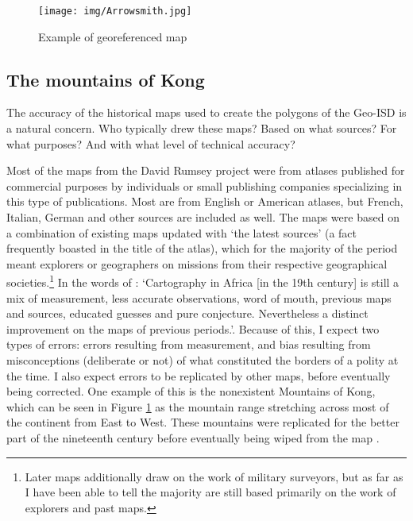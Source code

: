 \documentclass[12pt]{article}
\begin{document}

\begin{figure}[h!tpb]
	\centering
	\texttt{[image: img/Arrowsmith.jpg]}
	\caption{Example of georeferenced map}%
	\label{Arrowsmith}
\end{figure}


\subsection{The mountains of Kong} \label{The mountains of Kong}

The accuracy of the historical maps used to create the polygons of the Geo-ISD
is a natural concern. Who typically drew these maps? Based on what sources? For
what purposes? And with what level of technical accuracy? 

Most of the maps from the David Rumsey project were from atlases published
for commercial purposes by individuals or small publishing companies
specializing in this type of publications. Most are from English or American
atlases, but French, Italian, German and other sources are included as well. The
maps were based on a combination of existing maps updated with `the latest
sources' (a fact frequently boasted in the title of the atlas), which for the
majority of the period meant explorers or geographers on missions from their
respective geographical societies.\footnote{Later maps additionally draw on the
	work of military surveyors, but as far as I have been able to tell the
majority are still based primarily on the work of explorers and past maps.} In
the words of \citet[47-48]{Stone1995}: `Cartography in Africa [in the 19th
century] is still a mix of measurement, less accurate observations, word of
mouth, previous maps and sources, educated guesses and pure conjecture.
Nevertheless a distinct improvement on the maps of previous periods.'. Because
of this, I expect two types of errors: errors resulting from measurement, and
bias resulting from misconceptions (deliberate or not) of what constituted the
borders of a polity at the time. I also expect errors to be replicated by other
maps, before eventually being corrected. One example of this is the nonexistent
Mountains of Kong, which can be seen in Figure \ref{Arrowsmith} as the mountain
range stretching across most of the continent from East to West. These mountains
were replicated for the better part of the nineteenth century before
eventually being wiped from the map \citep{Bassett_1991}.
\end{document}
